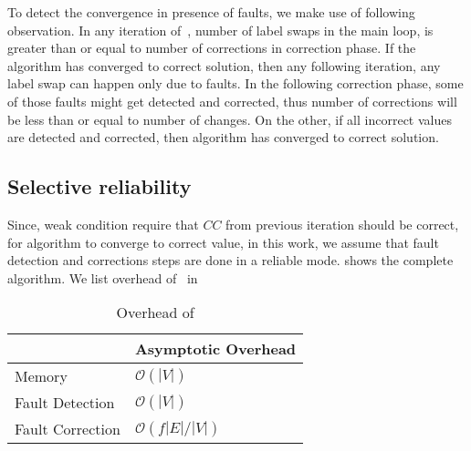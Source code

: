 %
To detect the convergence in presence of faults, we make use of following observation. 
In any iteration of~, number of label swaps in the main loop, is greater 
than or equal to number of corrections in correction phase.  If the algorithm has converged to 
correct solution, then any following iteration, any label swap can happen only due to faults.
In the following correction phase, some of those faults might get detected and corrected, thus 
number of corrections will be less than or equal to number of changes. On the other, if all
incorrect values are detected and corrected, then algorithm has converged to correct solution.  

\subsection{Selective reliability}
Since, weak condition require that $CC$ from previous iteration should be correct, for algorithm
to converge to correct value, in this work, we assume that fault detection and corrections steps 
are done in a reliable mode.   shows the complete algorithm.
We list overhead of~ in 

\begin{table}[htbp]
\centering
\caption{Overhead of \ftsv}
\label{tab:overhead}
\begin{tabular}{l|l}
\toprule 
                 & Asymptotic Overhead     \\
\midrule                  
Memory           & $\mathcal{O}(|V|)$      \\
Fault Detection  & $\mathcal{O}(|V|)$      \\
Fault Correction & $\mathcal{O}(f|E|/|V|)$ \\
\bottomrule 
\end{tabular}
\end{table}
